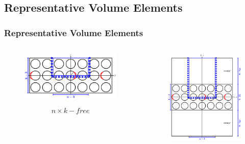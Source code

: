 \documentclass[first,firstsupp,lastsupp,last,hyperref,table]{ETHclass}
\begin{document}
\subsection{Representative Volume Elements}

\begin{frame}
\frametitle{\vspace{0.2cm}\small Representative Volume Elements}
\vspace{-1cm}
\centering
\begin{columns}[c]
\begin{column}{0.55\textwidth}
\centering
\begin{figure}
\centering
\includegraphics[width=\columnwidth]{freeThickPly.pdf}
\end{figure}
\vspace{-0.25cm}
\begin{equation*}
n\times k-free
\end{equation*}
\end{column}
\begin{column}{0.45\textwidth}
\centering
\begin{figure}
\centering
\includegraphics[width=\columnwidth]{ThickPly.pdf}

\end{figure}
\end{column}
\end{columns}
\end{frame}
\end{document}
